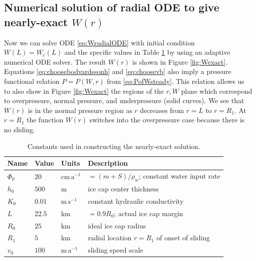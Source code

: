 \documentclass[11pt,final]{amsart}%
\begin{document}
\subsection*{Numerical solution of radial ODE to give nearly-exact $W(r)$}  Now we can solve ODE \eqref{eq:WradialODE} with initial condition $W(L)=W_c(L)$ and the specific values in Table \ref{tab:verifconstants} by using an adaptive numerical ODE solver.  The result $W(r)$ is shown in Figure \ref{fig:Wexact}.  Equations \eqref{eq:choosebodvardssonh} and \eqref{eq:choosevb} also imply a pressure functional relation $P=P(W,r)$ from \eqref{eq:PofWsteady}.  This relation allows us to also show in Figure \ref{fig:Wexact} the regions of the $r,W$ plane which correspond to overpressure, normal pressure, and underpressure (solid curves).  We see that $W(r)$ is in the normal pressure region as $r$ decreases from $r=L$ to $r=R_1$.  At $r=R_1$ the function $W(r)$ switches into the overpressure case because there is no sliding.

\begin{table}[ht]
  \centering
  \caption{Constants used in constructing the nearly-exact solution.}
  \begin{tabular}{lllp{3.0in}}
    \textbf{Name} & \textbf{Value} & \textbf{Units} & \textbf{Description}\\
\hline
    $\Phi_0$ & $20$ & $\text{cm}\,\text{a}^{-1}$ & $=(m+S)/\rho_w$; constant water input rate \\
    $h_0$ & $500$ & m & ice cap center thickness \\
    $K_0$ & $0.01$ & $\text{m}\,\text{s}^{-1}$ & constant hydraulic conductivity \\
    $L$   & $22.5$& km & $=0.9 R_0$; actual ice cap margin \\
    $R_0$ & $25$  & km & ideal ice cap radius \\
    $R_1$ & $5$   & km & radial location $r=R_1$ of onset of sliding \\
    $v_0$ & $100$ & $\text{m}\,\text{a}^{-1}$ & sliding speed scale \\
    \hline
  \end{tabular}
 \label{tab:verifconstants}
\end{table}
\end{document}
